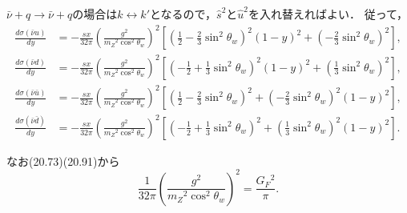 \(\bar\nu + q \to \bar\nu + q\)の場合は\(k \leftrightarrow k'\)となるので，\(\hat{s}^2\)と\(\hat{u}^2\)を入れ替えればよい．
従って，
\begin{align*}
  \frac{d\sigma(\bar\nu u)}{dy}
  &= - \frac{sx}{32\pi} \left(\frac{g^2}{m_Z{}^2\cos^2\theta_w}\right)^2
  \left[ \left(\frac{1}{2} - \frac{2}{3}\sin^2\theta_w\right)^2 (1-y)^2
  + \left( - \frac{2}{3}\sin^2\theta_w\right)^2 \right] , \\
  \frac{d\sigma(\bar\nu d)}{dy}
  &= - \frac{sx}{32\pi} \left(\frac{g^2}{m_Z{}^2\cos^2\theta_w}\right)^2
  \left[ \left( -\frac{1}{2} + \frac{1}{3}\sin^2\theta_w\right)^2 (1-y)^2
  + \left( \frac{1}{3}\sin^2\theta_w\right)^2 \right] , \\
  \frac{d\sigma(\bar\nu\bar{u})}{dy}
  &= - \frac{sx}{32\pi} \left(\frac{g^2}{m_Z{}^2\cos^2\theta_w}\right)^2
  \left[ \left(\frac{1}{2} - \frac{2}{3}\sin^2\theta_w\right)^2
  + \left( - \frac{2}{3}\sin^2\theta_w\right)^2 (1-y)^2 \right] , \\
  \frac{d\sigma(\bar\nu\bar{d})}{dy}
  &= - \frac{sx}{32\pi} \left(\frac{g^2}{m_Z{}^2\cos^2\theta_w}\right)^2
  \left[ \left( -\frac{1}{2} + \frac{1}{3}\sin^2\theta_w\right)^2
  + \left( \frac{1}{3}\sin^2\theta_w\right)^2 (1-y)^2 \right] .
\end{align*}

なお(20.73)(20.91)から
\[
\frac{1}{32\pi} \left(\frac{g^2}{m_Z{}^2\cos^2\theta_w}\right)^2 = \frac{G_F{}^2}{\pi} .
\]
